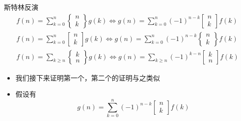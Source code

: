 \documentclass{beamer}
\begin{document}
\begin{frame}{斯特林反演}
    $$\begin{gathered}
        f(n) = \sum_{k = 0}^n\begin{Bmatrix}n\\ k\end{Bmatrix}g(k)\Leftrightarrow g(n) = \sum_{k = 0}^n(-1)^{n - k}\begin{bmatrix}n\\ k\end{bmatrix}f(k)\\
        f(n) = \sum_{k = 0}^n\begin{bmatrix}n\\ k\end{bmatrix}g(k)\Leftrightarrow g(n) = \sum_{k = 0}^n(-1)^{n - k}\begin{Bmatrix}n\\ k\end{Bmatrix}f(k)\\
        f(n) = \sum_{k\geq n}\begin{Bmatrix}k\\ n\end{Bmatrix}g(k)\Leftrightarrow g(n) = \sum_{k\geq n}(-1)^{k - n}\begin{bmatrix}k\\ n\end{bmatrix}f(k)
    \end{gathered}$$ \pause
    \begin{itemize}
        \item 我们接下来证明第一个，第二个的证明与之类似 \pause
        \item 假设有
        $$g(n) = \sum_{k = 0}^n(-1)^{n - k}\begin{bmatrix}n\\ k\end{bmatrix}f(k)$$
    \end{itemize}
\end{frame}
\end{document}
